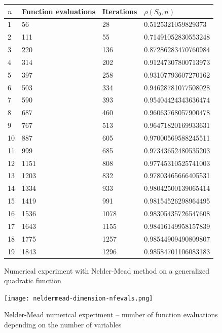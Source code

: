 \begin{figure}[htbp]
\begin{center}
\begin{tabular}{|l|l|l|l|}
\hline
$n$ & Function evaluations & Iterations & $\rho(S_0,n)$\\
\hline
1 & 56 & 28 & 0.5125321059829373\\
2 & 111 & 55 & 0.71491052830553248\\
3 & 220 & 136 & 0.87286283470760984\\
4 & 314 & 202 & 0.91247307800713973\\
5 & 397 & 258 & 0.93107793607270162\\
6 & 503 & 334 & 0.94628781077508028\\
7 & 590 & 393 & 0.95404424343636474\\
8 & 687 & 460 & 0.96063768057900478\\
9 & 767 & 513 & 0.96471820169933631\\
10 & 887 & 605 & 0.97000569588245511\\
11 & 999 & 685 & 0.97343652480535203\\
12 & 1151 & 808 & 0.97745310525741003\\
13 & 1203 & 832 & 0.97803465666405531\\
14 & 1334 & 933 & 0.98042500139065414\\
15 & 1419 & 991 & 0.98154526298964495\\
16 & 1536 & 1078 & 0.98305435726547608\\
17 & 1643 & 1155 & 0.98416149958157839\\
18 & 1775 & 1257 & 0.98544909490809807\\
19 & 1843 & 1296 & 0.98584701106083183\\
\hline
\end{tabular}
\end{center}
\caption{Numerical experiment with Nelder-Mead method on a generalized quadratic function}
\label{fig-nm-numexp3-dimension}
\end{figure}

\begin{figure}
\begin{center}
\texttt{[image: neldermead-dimension-nfevals.png]}
\end{center}
\caption{Nelder-Mead numerical experiment -- number of function evaluations 
depending on the number of variables}
\label{fig-nm-numexp3-fvn}
\end{figure}

